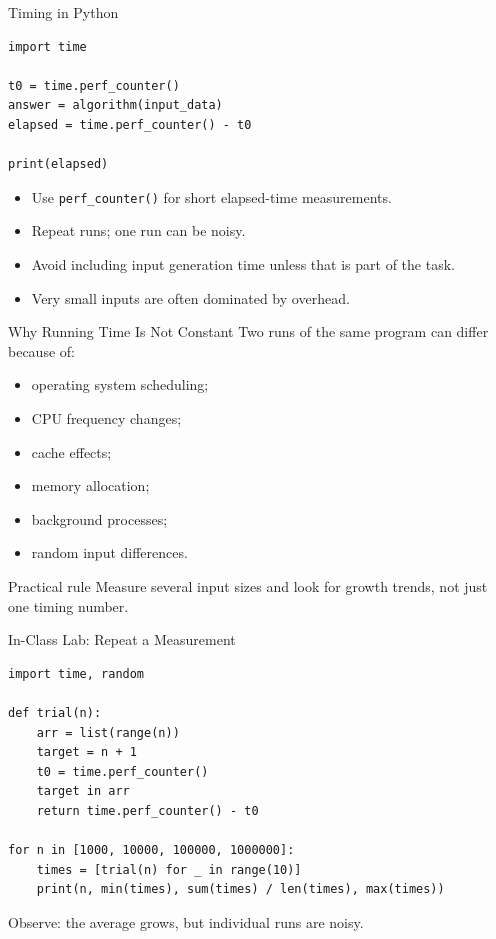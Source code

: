 \documentclass[aspectratio=169,xcolor=dvipsnames]{beamer}
\begin{document}
\begin{frame}[fragile]{Timing in Python}
  \begin{lstlisting}
import time

t0 = time.perf_counter()
answer = algorithm(input_data)
elapsed = time.perf_counter() - t0

print(elapsed)
  \end{lstlisting}
  \vspace{0.4em}
  \begin{itemize}
    \item Use \texttt{perf\_counter()} for short elapsed-time measurements.
    \item Repeat runs; one run can be noisy.
    \item Avoid including input generation time unless that is part of the task.
    \item Very small inputs are often dominated by overhead.
  \end{itemize}
\end{frame}

\begin{frame}{Why Running Time Is Not Constant}
  Two runs of the same program can differ because of:
  \begin{itemize}
    \item operating system scheduling;
    \item CPU frequency changes;
    \item cache effects;
    \item memory allocation;
    \item background processes;
    \item random input differences.
  \end{itemize}
  \vspace{0.5em}
  \begin{alertblock}{Practical rule}
    Measure several input sizes and look for growth trends, not just one timing number.
  \end{alertblock}
\end{frame}

\begin{frame}[fragile]{In-Class Lab: Repeat a Measurement}
  \begin{lstlisting}
import time, random

def trial(n):
    arr = list(range(n))
    target = n + 1
    t0 = time.perf_counter()
    target in arr
    return time.perf_counter() - t0

for n in [1000, 10000, 100000, 1000000]:
    times = [trial(n) for _ in range(10)]
    print(n, min(times), sum(times) / len(times), max(times))
  \end{lstlisting}
  \vspace{0.3em}
  Observe: the average grows, but individual runs are noisy.
\end{frame}
\end{document}
